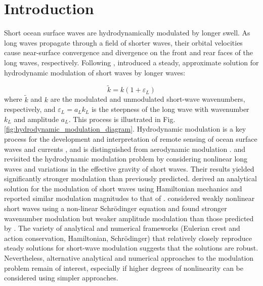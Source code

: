 \documentclass[lineno]{jfm}
\begin{document}

\section{Introduction}

Short ocean surface waves are hydrodynamically modulated by longer swell.
As long waves propagate through a field of shorter waves, their orbital
velocities cause near-surface convergence and divergence on the front and rear
faces of the long waves, respectively.
Following \citet{unna1941white,unna1942waves,unna1947sea},
\citet{longuet1960changes} introduced a steady, approximate solution for
hydrodynamic modulation of short waves by longer waves:

\begin{equation}
\label{eq:lhs1960wavenumber}
\widetilde{k} = k (1 + \varepsilon_L)
\end{equation}
where $\widetilde{k}$ and $k$ are the modulated and unmodulated short-wave wavenumbers,
respectively, and $\varepsilon_L = a_L k_L$ is the steepness of the long wave with
wavenumber $k_L$ and amplitude $a_L$.
This process is illustrated in Fig. \ref{fig:hydrodynamic_modulation_diagram}.
Hydrodynamic modulation is a key process for the development and
interpretation of remote sensing of ocean surface waves and currents
\citep{keller1975microwave,hara1994hydrodynamic}, and is distinguished
from aerodynamic modulation \citep{donelan1987effect,belcher1999wave,chen2000effects}.
\citet{phillips1981dispersion} and \citet{longuet1987propagation} revisited the
hydrodynamic modulation problem by considering nonlinear long waves and
variations in the effective gravity of short waves.
Their results yielded significantly stronger modulation than previously predicted.
\citet{henyey1988energy} derived an analytical solution for the modulation of
short waves using Hamiltonian mechanics and reported similar modulation magnitudes
to that of \citet{longuet1987propagation}.
\citet{zhang1990evolution} considered weakly nonlinear short waves
using a non-linear Schr\" odinger equation and found stronger wavenumber
modulation but weaker amplitude modulation than those predicted by
\citet{longuet1987propagation}.
The variety of analytical and numerical frameworks (Eulerian crest and action
conservation, Hamiltonian, Schr\" odinger) that relatively closely reproduce
steady solutions for short-wave modulation suggests that the solutions are robust.
Nevertheless, alternative analytical and numerical approaches to the modulation
problem remain of interest, especially if higher degrees of nonlinearity can be
considered using simpler approaches.
\end{document}
